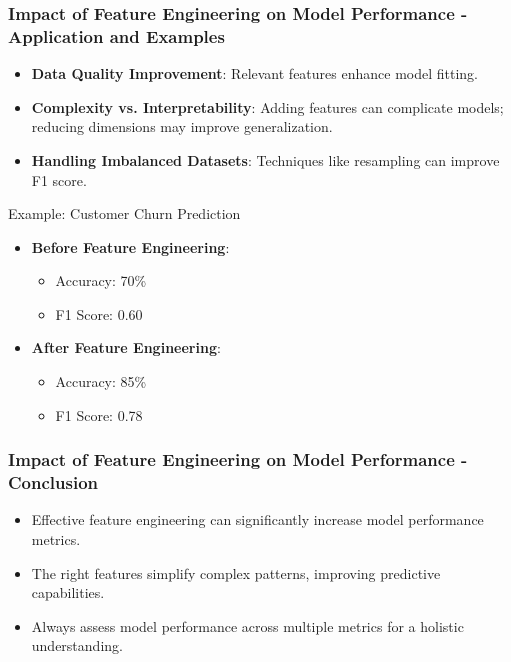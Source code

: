 \documentclass[aspectratio=169]{beamer}
\begin{document}
\begin{frame}[fragile]
    \frametitle{Impact of Feature Engineering on Model Performance - Application and Examples}
    \begin{itemize}
        \item \textbf{Data Quality Improvement}: Relevant features enhance model fitting.
        \item \textbf{Complexity vs. Interpretability}: Adding features can complicate models; reducing dimensions may improve generalization.
        \item \textbf{Handling Imbalanced Datasets}: Techniques like resampling can improve F1 score.
    \end{itemize}

    \begin{block}{Example: Customer Churn Prediction}
        \begin{itemize}
            \item \textbf{Before Feature Engineering}:
                \begin{itemize}
                    \item Accuracy: 70\%
                    \item F1 Score: 0.60
                \end{itemize}
            \item \textbf{After Feature Engineering}:
                \begin{itemize}
                    \item Accuracy: 85\%
                    \item F1 Score: 0.78
                \end{itemize}
        \end{itemize}
    \end{block}
\end{frame}

\begin{frame}[fragile]
    \frametitle{Impact of Feature Engineering on Model Performance - Conclusion}
    \begin{itemize}
        \item Effective feature engineering can significantly increase model performance metrics.
        \item The right features simplify complex patterns, improving predictive capabilities.
        \item Always assess model performance across multiple metrics for a holistic understanding.
    \end{itemize}
\end{frame}
\end{document}
